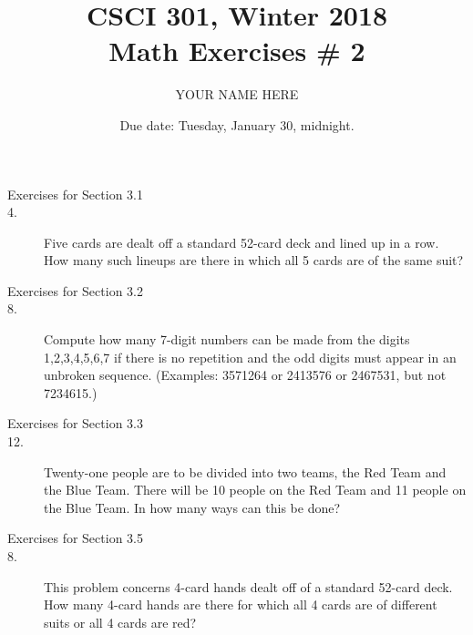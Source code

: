 \documentclass{article}
\title{CSCI 301, Winter 2018\\Math Exercises \# 2}
\author{YOUR NAME HERE}
\date{Due date:  Tuesday, January 30, midnight.}
\begin{document}
\maketitle

\begin{description}
\item[Exercises for Section 3.1]

\item[4.]  Five cards are dealt off a standard 52-card deck and
  lined up in a row.  How many such lineups are there in
  which all 5 cards are of the same suit?

\item[Exercises for Section 3.2]

\item[8.] Compute how many 7-digit numbers can be made from the digits
  1,2,3,4,5,6,7 if there is no repetition and the odd digits
  must appear in an unbroken sequence.  (Examples: 3571264 or 2413576 or
  2467531, but not 7234615.)

\item[Exercises for Section 3.3]

\item[12.] Twenty-one people are to be divided into two teams, the Red
  Team and the Blue Team.  There will be 10 people on the Red Team and
  11 people on the Blue Team.  In how many ways can this be done?

\item[Exercises for Section 3.5]


\item[8.] This problem concerns 4-card hands dealt off of a standard
  52-card deck.  How many 4-card hands are there for which all 4 cards
  are of different suits or all 4 cards are red?




\end{description}
\end{document}
